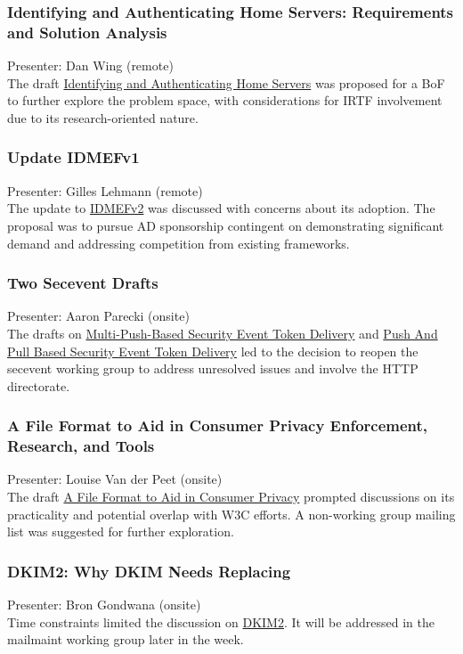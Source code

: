 \documentclass{article}
\begin{document}
\subsubsection{Identifying and Authenticating Home Servers: Requirements and Solution Analysis}
Presenter: Dan Wing (remote) \\
The draft \href{https://datatracker.ietf.org/doc/html/draft-rbw-home-servers-00}{Identifying and Authenticating Home Servers} was proposed for a BoF to further explore the problem space, with considerations for IRTF involvement due to its research-oriented nature.

\subsubsection{Update IDMEFv1}
Presenter: Gilles Lehmann (remote) \\
The update to \href{https://datatracker.ietf.org/doc/html/draft-lehmann-idmefv2}{IDMEFv2} was discussed with concerns about its adoption. The proposal was to pursue AD sponsorship contingent on demonstrating significant demand and addressing competition from existing frameworks.

\subsubsection{Two Secevent Drafts}
Presenter: Aaron Parecki (onsite) \\
The drafts on \href{https://datatracker.ietf.org/doc/html/draft-deshpande-secevent-http-multi-push}{Multi-Push-Based Security Event Token Delivery} and \href{https://datatracker.ietf.org/doc/html/draft-tulshibagwale-saag-pushpull-delivery}{Push And Pull Based Security Event Token Delivery} led to the decision to reopen the secevent working group to address unresolved issues and involve the HTTP directorate.

\subsubsection{A File Format to Aid in Consumer Privacy Enforcement, Research, and Tools}
Presenter: Louise Van der Peet (onsite) \\
The draft \href{https://datatracker.ietf.org/doc/html/draft-colwell-privacy-txt}{A File Format to Aid in Consumer Privacy} prompted discussions on its practicality and potential overlap with W3C efforts. A non-working group mailing list was suggested for further exploration.

\subsubsection{DKIM2: Why DKIM Needs Replacing}
Presenter: Bron Gondwana (onsite) \\
Time constraints limited the discussion on \href{https://datatracker.ietf.org/doc/html/draft-gondwana-dkim2-motivation}{DKIM2}. It will be addressed in the mailmaint working group later in the week.
\end{document}
